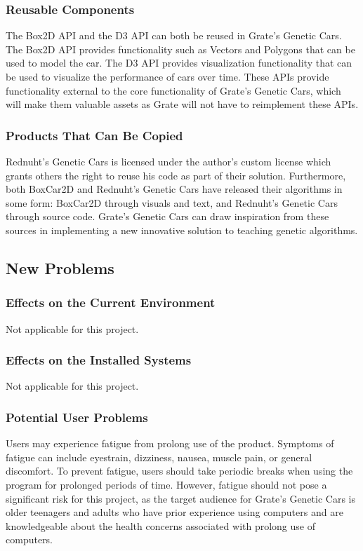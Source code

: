 \documentclass[12pt, titlepage]{article}
\begin{document}
\subsubsection{Reusable Components}
The Box2D API and the D3 API can both be reused in Grate's Genetic Cars. The 
Box2D API provides functionality such as Vectors and Polygons that can be used 
to model the car. The D3 API provides visualization functionality that can be 
used to visualize the performance of cars over time. These APIs provide 
functionality external to the core functionality of Grate's Genetic Cars, which 
will make them valuable assets as Grate will not have to reimplement these APIs.

\subsubsection{Products That Can Be Copied}
Rednuht's Genetic Cars is licensed under the author's custom license which 
grants others the right to reuse his code as part of their solution. 
Furthermore, both BoxCar2D and Rednuht's Genetic Cars have released their 
algorithms in some form: BoxCar2D through visuals and text, and Rednuht's 
Genetic Cars through source code. Grate's Genetic Cars can draw inspiration from 
these sources in implementing a new innovative solution to teaching genetic 
algorithms.

\subsection{New Problems}

\subsubsection{Effects on the Current Environment}
Not applicable for this project.

\subsubsection{Effects on the Installed Systems}
Not applicable for this project.

\subsubsection{Potential User Problems}
Users may experience fatigue from prolong use of the product. Symptoms of 
fatigue can include eyestrain, dizziness, nausea, muscle pain, or general 
discomfort. To prevent fatigue, users should take periodic breaks when using the 
program for prolonged periods of time. However, fatigue should not pose a 
significant risk for this project, as the target audience for Grate's Genetic 
Cars is older teenagers and adults who have prior experience using computers and 
are  knowledgeable about the health concerns associated with prolong use of 
computers.
\end{document}

